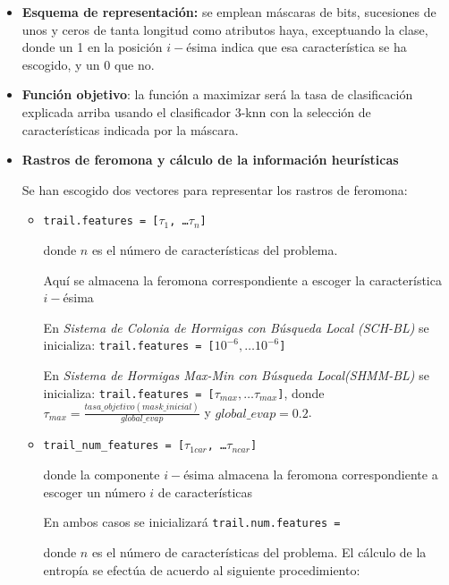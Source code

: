 \documentclass[a4paper,11pt]{article}
\begin{document}
\begin{itemize} 
\item \textbf{Esquema de representación:} se emplean máscaras de bits, sucesiones de unos y ceros de tanta longitud como atributos haya,
exceptuando la clase, donde un 1 en la posición $i-$ésima indica que esa característica se ha escogido, y un $0$ que no.

\item \textbf{Función objetivo}: la función a maximizar será la tasa de clasificación explicada arriba usando el clasificador
3-knn con la selección de características indicada por la máscara.\\

  \small\texttt{}
  \normalsize
  
\item \textbf{Rastros de feromona y cálculo de la información heurísticas}

Se han escogido dos vectores para representar los rastros de feromona:

\begin{itemize}
  \item \texttt{trail.features = [$\tau_1$, \ldots $\tau_n$]}
  
    donde $n$ es el número de características del problema.
    
    Aquí se almacena la feromona correspondiente a escoger la característica $i-$ésima
    
    En \textit{Sistema de Colonia de Hormigas con Búsqueda Local (SCH-BL)} se inicializa: \texttt{trail.features = [$10^{-6},\ldots 10^{-6}$]}
    
    En \textit{Sistema de Hormigas Max-Min con Búsqueda Local(SHMM-BL)} se inicializa: \texttt{trail.features = [$\tau_{max},\ldots \tau_{max}$]},
    donde \texttt{$\tau_{max} = \frac{tasa\_objetivo(mask\_inicial)}{global\_evap}$} y $global\_evap = 0.2$.
  \item \texttt{trail\_num\_features = [$\tau_{1 car}$, \ldots $\tau_{n car}$]}
  
    donde la componente $i-$ésima almacena la feromona correspondiente a escoger un número $i$ de características
    
    En ambos casos se inicializará \texttt{trail.num.features = }
    
    donde $n$ es el número de características del problema.
  El cálculo de la entropía se efectúa de acuerdo al siguiente procedimiento:\\


\end{itemize}
\end{itemize}
\end{document}
